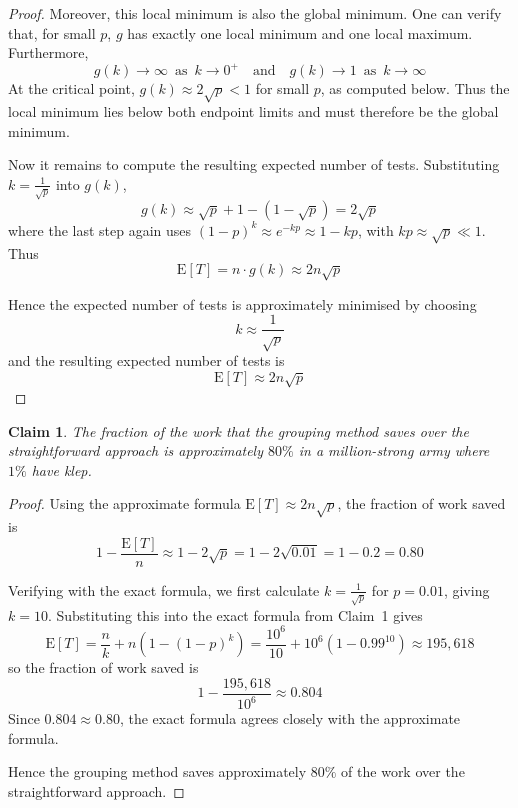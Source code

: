 \documentclass{article}
\newtheorem{claim}{Claim}
\begin{document}
\begin{proof}
    \medskip
    
    Moreover, this local minimum is also the global minimum. One can verify that, for small $p$, $g$ has exactly 
    one local minimum and one local maximum. Furthermore,
    \[
    g(k) \to \infty \, \text{ as } \, k \to 0^+ \quad \text{and} \quad g(k) \to 1 \, \text{ as } \, k \to \infty
    \]
    At the critical point, $g(k) \approx 2\sqrt{p} < 1$ for small $p$, as computed below. Thus the local 
    minimum lies below both endpoint limits and must therefore be the global minimum.

    \medskip

    Now it remains to compute the resulting expected number of tests. Substituting $k = \frac{1}{\sqrt{p}}$ 
    into $g(k)$, 
    \[
    g(k) \approx \sqrt{p} + 1 - (1 - \sqrt{p}) = 2\sqrt{p}
    \]
    where the last step again uses $(1 - p)^k \approx e^{-kp} \approx 1 - kp$, with $kp \approx \sqrt{p} \ll 1$. 
    Thus
    \[
    \mathrm{E}[T] = n \cdot g(k) \approx 2n\sqrt{p}
    \]

    \medskip

    Hence the expected number of tests is approximately minimised by choosing 
    \[
    k \approx \frac{1}{\sqrt{p}}
    \]
    and the resulting expected number of tests is 
    \[
    \mathrm{E}[T] \approx 2n\sqrt{p}
    \]
\end{proof}

\begin{claim}
    The fraction of the work that the grouping method saves over the straightforward approach is approximately 
    $80\%$ in a million-strong army where $1\%$ have klep.
\end{claim}

\begin{proof}
    Using the approximate formula $\mathrm{E}[T] \approx 2n\sqrt{p}$, the fraction of work saved is
    \[
    1 - \frac{\mathrm{E}[T]}{n} \approx 1 - 2\sqrt{p} = 1 - 2\sqrt{0.01} = 1 - 0.2 = 0.80
    \]

    \medskip

    Verifying with the exact formula, we first calculate $k = \frac{1}{\sqrt{p}}$ for $p = 0.01$, giving 
    $k = 10$. Substituting this into the exact formula from Claim~1 gives
    \[
    \mathrm{E}[T] = \frac{n}{k} + n\left(1-(1-p)^k\right) = \frac{10^6}{10} + 10^6\left(1-0.99^{10}\right) 
    \approx 195{,}618
    \]
    so the fraction of work saved is
    \[
    1 - \frac{195{,}618}{10^6} \approx 0.804
    \]
    Since $0.804 \approx 0.80$, the exact formula agrees closely with the approximate formula.

    \medskip

    Hence the grouping method saves approximately $80\%$ of the work over the straightforward approach.
\end{proof}
\end{document}
